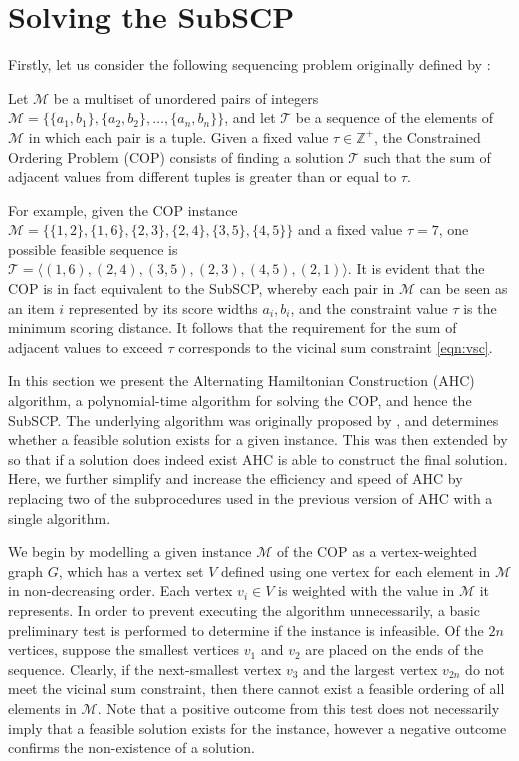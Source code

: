 \documentclass[authoryear]{elsarticle}
\begin{document}
\section{Solving the SubSCP}
\label{sec:ahc}
\noindent Firstly, let us consider the following sequencing problem originally defined by \citet{hawa2018}:

\begin{definition} %
	\label{defn:cop}
	Let $\mathcal{M}$ be a multiset of unordered pairs of integers $\mathcal{M} = \{\{a_1, b_1\}, \{a_2, b_2\},\dotsc,\{a_n, b_n\}\}$, and let $\mathcal{T}$ be a sequence of the elements of $\mathcal{M}$ in which each pair is a tuple. Given a fixed value $\tau \in \mathbb{Z}^+$, the Constrained Ordering Problem (COP) consists of finding a solution $\mathcal{T}$ such that the sum of adjacent values from different tuples is greater than or equal to $\tau$.
\end{definition}

\noindent For example, given the COP instance $\mathcal{M} = \{\{1,2\}, \{1,6\}, \{2,3\}, \{2,4\}, \{3,5\}, \{4,5\}\}$ and a fixed value $\tau = 7$, one possible feasible sequence is $\mathcal{T} = \langle(1,6), (2,4), (3,5), (2,3), (4,5), (2,1)\rangle$. It is evident that the COP is in fact equivalent to the SubSCP, whereby each pair in $\mathcal{M}$ can be seen as an item $i$ represented by its score widths $a_i, b_i$, and the constraint value $\tau$ is the minimum scoring distance. It follows that the requirement for the sum of adjacent values to exceed $\tau$ corresponds to the vicinal sum constraint \eqref{eqn:vsc}.

In this section we present the Alternating Hamiltonian Construction (AHC) algorithm, a polynomial-time algorithm for solving the COP, and hence the SubSCP. The underlying algorithm was originally proposed by \citet{becker2010}, and determines whether a feasible solution exists for a given instance. This was then extended by \citet{hawa2018} so that if a solution does indeed exist AHC is able to construct the final solution. Here, we further simplify and increase the efficiency and speed of AHC by replacing two of the subprocedures used in the previous version of AHC with a single algorithm.

We begin by modelling a given instance $\mathcal{M}$ of the COP as a vertex-weighted graph $G$, which has a vertex set $V$ defined using one vertex for each element in $\mathcal{M}$ in non-decreasing order. Each vertex $v_i \in V$ is weighted with the value in $\mathcal{M}$ it represents. In order to prevent executing the algorithm unnecessarily, a basic preliminary test is performed to determine if the instance is infeasible. Of the $2n$ vertices, suppose the smallest vertices $v_1$ and $v_2$ are placed on the ends of the sequence. Clearly, if the next-smallest vertex $v_3$ and the largest vertex $v_{2n}$ do not meet the vicinal sum constraint, then there cannot exist a feasible ordering of all elements in $\mathcal{M}$. Note that a positive outcome from this test does not necessarily imply that a feasible solution exists for the instance, however a negative outcome confirms the non-existence of a solution.
\end{document}
